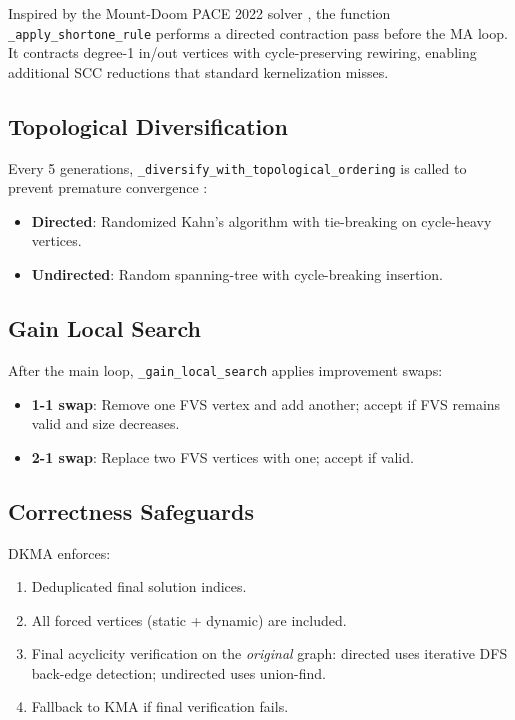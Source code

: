 \documentclass[10pt,a4paper]{report}
\theoremstyle{definition}
\begin{document}
Inspired by the Mount-Doom PACE 2022 solver \cite{langedal2022}, the function \texttt{\_apply\_shortone\_rule} performs a directed contraction pass before the MA loop. It contracts degree-1 in/out vertices with cycle-preserving rewiring, enabling additional SCC reductions that standard kernelization misses.

\subsection{Topological Diversification}

Every 5 generations, \texttt{\_diversify\_with\_topological\_ordering} is called to prevent premature convergence \cite{lust2010}:
\begin{itemize}
	\item \textbf{Directed}: Randomized Kahn's algorithm with tie-breaking on cycle-heavy vertices.
	\item \textbf{Undirected}: Random spanning-tree with cycle-breaking insertion.
\end{itemize}

\subsection{Gain Local Search}

After the main loop, \texttt{\_gain\_local\_search} applies improvement swaps:
\begin{itemize}
	\item \textbf{1-1 swap}: Remove one FVS vertex and add another; accept if FVS remains valid and size decreases.
	\item \textbf{2-1 swap}: Replace two FVS vertices with one; accept if valid.
\end{itemize}

\subsection{Correctness Safeguards}

DKMA enforces:
\begin{enumerate}
	\item Deduplicated final solution indices.
	\item All forced vertices (static + dynamic) are included.
	\item Final acyclicity verification on the \emph{original} graph: directed uses iterative DFS back-edge detection; undirected uses union-find.
	\item Fallback to KMA if final verification fails.
\end{enumerate}
\end{document}

